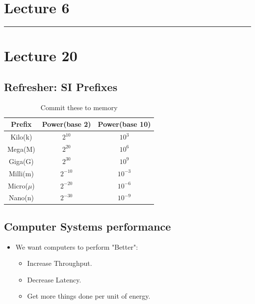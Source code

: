 \documentclass{article}
\begin{document}
\section*{Lecture 6}





\begin{center}
	\rule{450pt}{1pt} 
\end{center}
\newpage

\section*{Lecture 20}

\subsection*{Refresher: SI Prefixes}

\begin{table}[h]
    \centering
    \begin{tabular}{|c|c|c|}
        \hline
        Prefix & Power(base 2) & Power(base 10) \\
        \hline
        Kilo(k) & $2^{10}$ & $10^3$\\
        Mega(M) & $2^{20}$ & $10^6$\\
        Giga(G) & $2^{30}$ & $10^9$\\
        \hline
        Milli(m) & $2^{-10}$ & $10^{-3}$\\
        Micro($\mu$) & $2^{-20}$ & $10^{-6}$\\
        Nano(n) & $2^{-30}$ & $10^{-9}$\\
        \hline
    \end{tabular}
    \caption*{Commit these to memory}
    \label{tab:example}
\end{table}

\subsection*{Computer Systems performance}

\begin{itemize}
    \item We want computers to perform "Better":
    \begin{itemize}
        \item Increase Throughput.
        \item Decrease Latency.
        \item Get more things done per unit of energy.
    \end{itemize}
\end{itemize}
\end{document}
